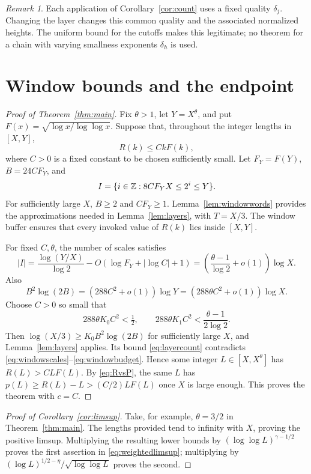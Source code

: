 \documentclass[11pt]{article}
\numberwithin{equation}{section}
\theoremstyle{remark}\newtheorem{remark}[theorem]{Remark}
\begin{document}
\begin{remark}
Each application of Corollary~\ref{cor:count} uses a fixed quality
$\delta_j$. Changing the layer changes this common quality and the
associated normalized heights. The uniform bound for the cutoffs
makes this legitimate; no theorem for a chain with varying
smallness exponents $\delta_h$ is used.
\end{remark}

\section{Window bounds and the endpoint}\label{sec:completion}
\begin{proof}[Proof of Theorem~\ref{thm:main}]
Fix $\theta>1$, let $Y=X^\theta$, and put
$F(x)=\sqrt{\log x/\log\log x}$.
Suppose that, throughout the integer lengths in $[X,Y]$,
\begin{equation}\label{eq:windowLC}
 R(k)\le CkF(k),
\end{equation}
where $C>0$ is a fixed constant to be chosen sufficiently small.
Let $F_Y=F(Y)$, $B=24CF_Y$, and
\[
 I=\{i\in\mathbb Z:8CF_YX\le2^i\le Y\}.
\]
For sufficiently large $X$, $B\ge2$ and $CF_Y\ge1$.
Lemma~\ref{lem:windowwords} provides the approximations needed in
Lemma~\ref{lem:layers}, with $T=X/3$.
The window buffer ensures that every invoked value of $R(k)$
lies inside $[X,Y]$.

For fixed $C,\theta$, the number of scales satisfies
\begin{equation}\label{eq:windowscales}
 |I|=\frac{\log(Y/X)}{\log2}-O(\log F_Y+|\log C|+1)
 =\left(\frac{\theta-1}{\log2}+o(1)\right)\log X.
\end{equation}
Also
\begin{equation}\label{eq:windowbudget}
 B^2\log(2B)
 =(288C^2+o(1))\log Y
 =(288\theta C^2+o(1))\log X.
\end{equation}
Choose $C>0$ so small that
\[
 288\theta K_0C^2<\tfrac12,\qquad
 288\theta K_1C^2<\frac{\theta-1}{2\log2}.
\]
Then $\log(X/3)\ge K_0B^2\log(2B)$ for sufficiently large $X$,
and Lemma~\ref{lem:layers} applies.
Its bound \eqref{eq:layercount} contradicts
\eqref{eq:windowscales}--\eqref{eq:windowbudget}.
Hence some integer $L\in[X,X^\theta]$ has $R(L)>CLF(L)$.
By \eqref{eq:RvsP}, the same $L$ has
$p(L)\ge R(L)-L>(C/2)LF(L)$ once $X$ is large enough.
This proves the theorem with $c=C$.
\end{proof}

\begin{proof}[Proof of Corollary~\ref{cor:limsup}]
Take, for example, $\theta=3/2$ in Theorem~\ref{thm:main}.
The lengths provided tend to infinity with $X$, proving the positive
limsup. Multiplying the resulting lower bounds by
$(\log\log L)^{\gamma-1/2}$ proves the first assertion in
\eqref{eq:weightedlimsup}; multiplying by
$(\log L)^{1/2-\eta}/\sqrt{\log\log L}$ proves the second.
\end{proof}
\end{document}
